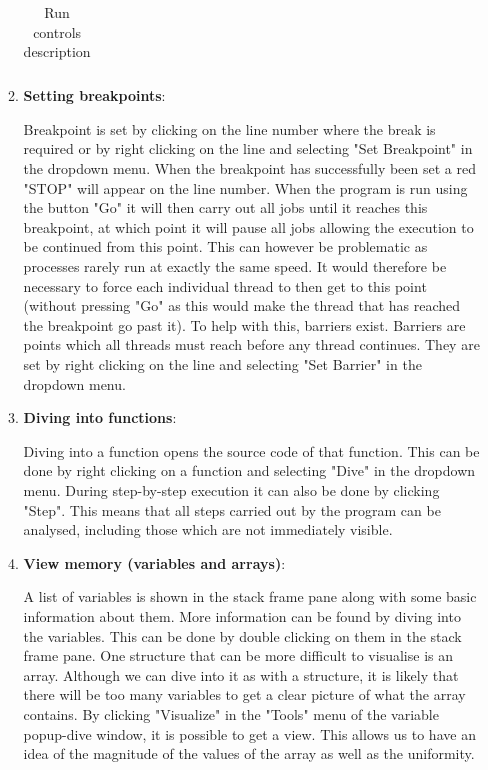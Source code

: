 \documentclass[10pt, letterpaper, twoside]{article}
\begin{document}
\begin{titlepage}
\begin{enumerate}
\begin{enumerate}
\begin{table}
\begin{tabular}{| p{2cm} | p{10cm} |}
\end{tabular} 
\caption{Run controls description}
\end{table}  

\item \textbf{Setting breakpoints}:

Breakpoint is set by clicking on the line number where the break is required or by right clicking on the line and selecting "Set Breakpoint" in the dropdown menu. When the breakpoint has successfully been set a red "STOP" will appear on the line number. When the program is run using the button "Go" it will then carry out all jobs until it reaches this breakpoint, at which point it will pause all jobs allowing the execution to be continued from this point. This can however be problematic as processes rarely run at exactly the same speed. It would therefore be necessary to force each individual thread to then get to this point (without pressing "Go" as this would make the thread that has reached the breakpoint go past it). To help with this, barriers exist. Barriers are points which all threads must reach before any thread continues. They are set by right clicking on the line and selecting "Set Barrier" in the dropdown menu. \\

\item \textbf{Diving into functions}:

Diving into a function opens the source code of that function. This can be done by right clicking on a function and selecting "Dive" in the dropdown menu. During step-by-step execution it can also be done by clicking "Step". This means that all steps carried out by the program can be analysed, including those which are not immediately
visible. \\

\item \textbf{View memory (variables and arrays)}:

A list of variables is shown in the stack frame pane along with some basic information about them. More information can be found by diving into the variables. This can be done by double clicking on them in the stack frame pane. One structure that can be more difficult to visualise is an array. Although we can dive into it as with a structure, it is likely that there will be too many variables to get a clear picture of what the array contains. By clicking "Visualize" in the "Tools" menu of the variable popup-dive window, it is possible to get a view. This allows us to have an idea of the magnitude of the values of the array as well as the uniformity. \\


\end{enumerate}
\end{enumerate}
\end{titlepage}
\end{document}
